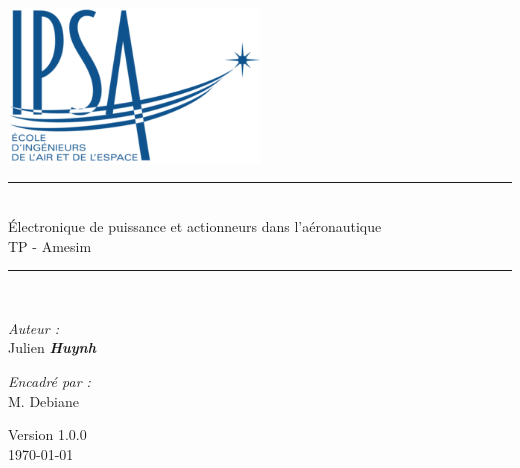 \documentclass[a4paper,12pt,calibri,oneside,openany]{book}
\theoremstyle{break}
\begin{document}
\renewcommand{\bibname}{Bibliographie et Webographie}

\begin{titlepage}
\begin{center}

\includegraphics[width=0.5\textwidth]{ipsa}\\[1cm]



\rule{\linewidth}{0.5mm} \\[0.4cm]
{ \huge  Électronique de puissance et actionneurs dans l'aéronautique }\\
TP - Amesim
\rule{\linewidth}{0.5mm} \\[1.5cm]

\vspace{0.8cm}
\noindent
\begin{minipage}{0.4\textwidth}
  \begin{flushleft} \large
    \emph{Auteur :}\\
   
    Julien \textbf{\textit{Huynh}}\\

  \end{flushleft}
\end{minipage}%
\begin{minipage}{0.4\textwidth}
  \begin{flushright} \large
    \emph{Encadré par :} \\
    M. Debiane\\
  \end{flushright}
\end{minipage}

\vfill

{\large Version 1.0.0\\ \today}

\end{center}
\end{titlepage}
\end{document}
